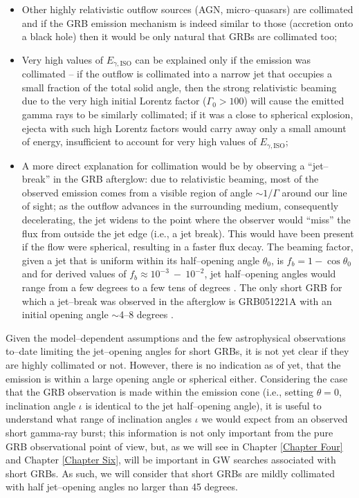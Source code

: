 \begin{itemize}
\item
Other highly relativistic outflow sources (AGN, micro--quasars) are collimated and if the GRB emission mechanism is indeed similar to those (accretion onto a black hole) then it would be only natural that GRBs are collimated too; 
\item
Very high values of $E_{\gamma, \mathrm{ISO}}$ can be explained only if the emission was collimated -- if the outflow is collimated into a narrow jet that occupies a small fraction of the total solid angle, then the strong relativistic beaming due to the very high initial Lorentz factor ($\Gamma_0 > 100$) will cause the emitted gamma rays to be similarly collimated; if it was a close to spherical explosion, ejecta with such high Lorentz factors would carry away only a small amount of energy, insufficient to account for very high values of $E_{\gamma, \mathrm{ISO}}$;
\item
A more direct explanation for collimation would be by observing a ``jet--break'' in the GRB afterglow: due to relativistic beaming, most of the observed emission comes from a visible region of angle $\sim1/\Gamma$ around our line of sight; as the outflow advances in the surrounding medium, consequently decelerating, the jet widens to the point where the observer would ``miss'' the flux from outside the jet edge (i.e., a jet break). This would have been present if the flow were spherical, resulting in a faster flux decay. The beaming factor, given a jet that is uniform within its half--opening angle $\theta_0$, is $f_b=1-\cos \theta_0$ and for derived values of $f_b \approx 10^{-3}~-~10^{-2}$, jet half--opening angles would range from a few degrees to a few tens of degrees \cite{Granot:2010iq}. The only short GRB for which a jet--break was observed in the afterglow is GRB051221A with an initial opening angle $\sim$4--8 degrees \cite{Burrows:2006ar}.
\end{itemize}

Given the model--dependent assumptions and the few astrophysical observations to--date limiting the jet--opening angles for short GRBs, it is not yet clear if they are highly collimated or not. However, there is no indication as of yet, that the emission is within a large opening angle or spherical either. Considering the case that the GRB observation is made within the emission cone (i.e., setting $\theta = 0$, inclination angle $\iota$ is identical to the jet half--opening angle), it is useful to understand what range of inclination angles $\iota$ we would expect from an observed short gamma-ray burst; this information is not only important from the pure GRB observational point of view, but, as we will see in Chapter \ref{Chapter Four} and Chapter \ref{Chapter Six}, will be important in GW searches associated with short GRBs. As such, we will consider that short GRBs are mildly collimated with half jet--opening angles no larger than 45 degrees.  


